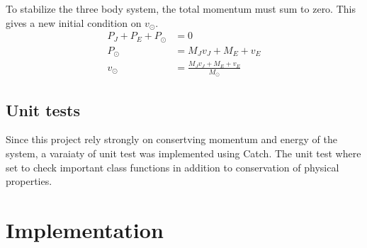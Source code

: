\documentclass[twoside,twocolumn]{article}
\newcommand{\sun}{\odot}
\begin{document}
To stabilize the three body system, the total momentum must sum to zero. This gives a new initial condition on $v_\sun$.
\begin{align*}
P_J+P_E+P_\sun &= 0\\
P_\sun &= M_Jv_J+M_E+v_E\\
v_\sun &= \frac{M_Jv_J+M_E+v_E}{M_\sun}
\end{align*}
\subsection*{Unit tests}
Since this project rely strongly on consertving momentum and energy of the system, a varaiaty of unit test was implemented using Catch. The unit test where set to check important class functions in addition to conservation of physical properties.
\newpage
\section{Implementation}
\label{sec:implementation}
\end{document}
